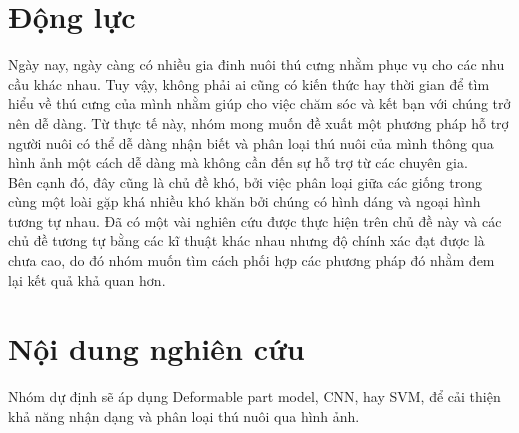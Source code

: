 \documentclass{article}
\begin{document}
	\section{Động lực}
	Ngày nay, ngày càng có nhiều gia đinh nuôi thú cưng nhằm phục vụ cho các nhu cầu khác nhau. Tuy vậy, không phải ai cũng có kiến thức hay thời gian để tìm hiểu về thú cưng của mình nhằm giúp cho việc chăm sóc và kết bạn với chúng trở nên dễ dàng. Từ thực tế này, nhóm mong muốn đề xuất một phương pháp hỗ trợ người nuôi có thể dễ dàng nhận biết và phân loại thú nuôi của mình thông qua hình ảnh một cách dễ dàng mà không cần đến sự hỗ trợ từ các chuyên gia.\\
	Bên cạnh đó, đây cũng là chủ đề khó, bởi việc phân loại giữa các giống trong cùng một loài gặp khá nhiều khó khăn bởi chúng có hình dáng và ngoại hình tương tự nhau. Đã có một vài nghiên cứu được thực hiện trên chủ đề này và các chủ đề tương tự bằng các kĩ thuật khác nhau nhưng độ chính xác đạt được là chưa cao, do đó nhóm muốn tìm cách phối hợp các phương pháp đó nhằm đem lại kết quả khả quan hơn. 
	\section{Nội dung nghiên cứu}
	Nhóm dự định sẽ áp dụng Deformable part model, CNN, hay SVM, để cải thiện khả năng nhận dạng và phân loại thú nuôi qua hình ảnh.
\end{document}
